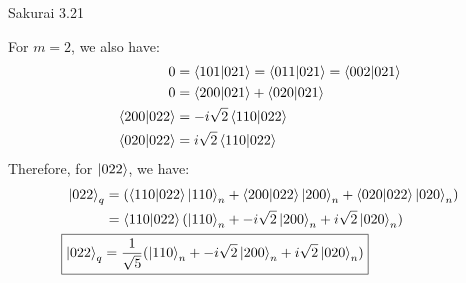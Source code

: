 \documentclass{article}
\begin{document}
\begin{section}{Sakurai 3.21}
\begin{enumerate}
\begin{tcolorbox}[breakable]
		For $m=2$, we also have:
		\begin{align*}
			0                  & = \bra{101}\ket{021} = \bra{011}\ket{021} = \bra{002}\ket{021} \\
			0                  & = \bra{200}\ket{021} + \bra{020}\ket{021}                      \\
			\bra{200}\ket{022} & = -i\sqrt{2} \bra{110}\ket{022}                                \\
			\bra{020}\ket{022} & = i\sqrt{2} \bra{110}\ket{022}                                 \\
		\end{align*}
		Therefore, for $\ket{022}$, we have:
		\begin{align*}
			\ket{022}_q         & = (\bra{110}\ket{022} \ket{110}_n + \bra{200}\ket{022} \ket{200}_n + \bra{020}\ket{022} \ket{020}_n) \\
			                    & = \bra{110}\ket{022} (\ket{110}_n + -i\sqrt{2} \ket{200}_n + i\sqrt{2} \ket{020}_n)                  \\
			\Aboxed{\ket{022}_q & =\frac{1}{\sqrt{5}} (\ket{110}_n + -i\sqrt{2} \ket{200}_n + i\sqrt{2} \ket{020}_n)}
		\end{align*}

	\end{tcolorbox}
\end{enumerate}
\end{section}
\end{document}
